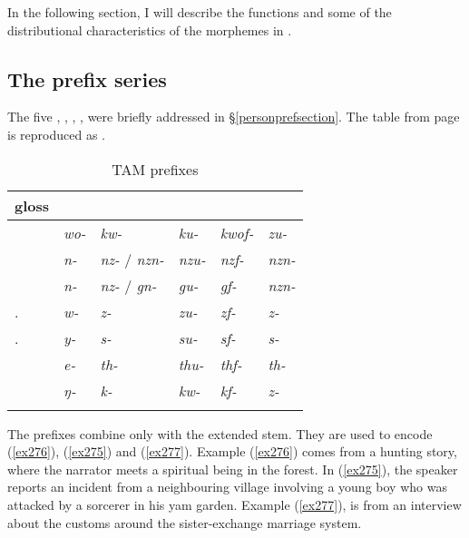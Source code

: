 In the following section, I will describe the functions and some of the distributional characteristics of the morphemes in .

\clearpage 
\subsection{The prefix series} \label{tamprefixseries}

The five  \Alph, \Bet, \Betaone, \Betatwo, \Gam{} were briefly addressed in {\S}\ref{personprefsection}. The table from page \pageref{perspref} is reproduced as .

\begin{table}
\caption{TAM prefixes}
\label{perspref2}
	\begin{tabularx}{\textwidth}{XXXXXl}
		\lsptoprule
		{gloss} &\Alph &\Bet &\Betaone &\Betatwo	&\Gam\\\midrule
		\Fsg &\emph{wo-} &\emph{kw-} &\emph{ku-} &\emph{kwof-} &\emph{zu-}\\
		\Fnsg &\emph{n-} &\emph{nz-} / \emph{nzn-} &\emph{nzu-} &\emph{nzf-} &\emph{nzn-}\\
		\Ssg &\emph{n-} &\emph{nz-} / \emph{gn-} &\emph{gu-} &\emph{gf-} &\emph{nzn-}\\
		\Tsg.\F &\emph{w-} &\emph{z-} &\emph{zu-} &\emph{zf-} &\emph{z-}\\
		\Tsg.\Masc &\emph{y-} &\emph{s-} &\emph{su-} &\emph{sf-} &\emph{s-}	\\
		\Stnsg &\emph{e-} &\emph{th-} &\emph{thu-} &\emph{thf-} &\emph{th-}\\
		\M &\emph{ŋ-} &\emph{k-} &\emph{kw-} &\emph{kf-} &\emph{z-}\\
		\lspbottomrule
	\end{tabularx}
\end{table}%

The \Alph{} prefixes combine only with the extended stem. They are used to encode  (\ref{ex276}),   (\ref{ex275}) and   (\ref{ex277}). Example (\ref{ex276}) comes from a hunting story, where the narrator meets a spiritual being in the forest. In (\ref{ex275}), the speaker reports an incident from a neighbouring village involving a young boy who was attacked by a sorcerer in his yam garden. Example (\ref{ex277}), is from an interview about the customs around the sister-exchange marriage system.

